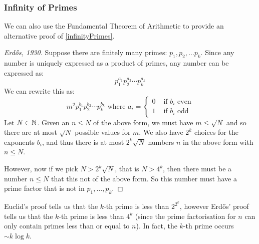 \documentclass[../main.tex]{subfiles}
\begin{document}
\subsubsection{Infinity of Primes}
We can also use the Fundamental Theorem of Arithmetic to provide an alternative proof of \cref{infinityPrimes}.
\begin{proof}[Erd\H{o}s, 1930]
  Suppose there are finitely many primes: $p_1, p_2, \ldots p_k$.
  Since any number is uniquely expressed as a product of primes, any number can be expressed as:
  \[
    p^{a_1}_{1} p^{a_2}_{2} \cdots p^{a_k}_{k}
  \]
  We can rewrite this as:
  \[
    m^2 p^{b_1}_{1} p^{b_2}_{2} \cdots p^{b_k}_{k} \text{ where } a_i = \begin{cases}
    0 & \text{ if $b_i$ even} \\
    1 & \text{ if $b_i$ odd}
    \end{cases}
  \]
  Let $N \in \mathbb{N}$.
  Given an $n \leq N$ of the above form, we must have $m \leq \sqrt{N}$ and so there are at most $\sqrt{N}$ possible values for $m$.
  We also have $2^{k}$ choices for the exponents $b_i$, and thus there is at most $2^{k}\sqrt{N}$ numbers $n$ in the above form with $n \leq N$.

  However, now if we pick $N > 2^{k}\sqrt{N}$, that is $N > 4^{k}$, then there must be a number $n \leq N$ that this not of the above form.
  So this number must have a prime factor that is not in $p_1, \ldots, p_k$.
\end{proof}
\begin{remark}
  Euclid's proof tells us that the $k$-th prime is less than $2^{2^{k}}$, however Erd\H{o}s' proof tells us that the $k$-th prime is less than $4^{k}$ (since the prime factorisation for $n$ can only contain primes less than or equal to $n$).
  In fact, the $k$-th prime occurs $\sim k \log k$.
\end{remark}
\end{document}
